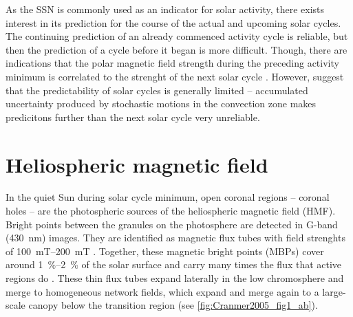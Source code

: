 As the SSN is commonly used as an indicator for solar activity, there exists interest in its prediction for the course of the actual and upcoming solar cycles. The continuing prediction of an already commenced activity cycle is reliable, but then the prediction of a cycle before it began is more difficult. Though, there are indications that the polar magnetic field strength during the preceding activity minimum is correlated to the strenght of the next solar cycle \citep{Schatten1987}. However, \citet{Hathaway2016} suggest that the predictability of solar cycles is generally limited -- accumulated uncertainty produced by stochastic motions in the convection zone makes predicitons further than the next solar cycle very unreliable.


\section{Heliospheric magnetic field}
\label{sec:heliospheric_magnetic_field}
In the quiet Sun during solar cycle minimum, open coronal regions -- coronal holes -- are the photospheric sources of the heliospheric magnetic field (HMF). Bright points between the granules on the photosphere are detected in G-band (\SI{430}{\nano\meter}) images. They are identified as magnetic flux tubes with field strenghts of \SIrange{100}{200}{\milli\tesla} \citep{Cranmer2005}. Together, these magnetic bright points (MBPs) cover around \SIrange{1}{2}{\%} of the solar surface and carry many times the flux that active regions do \citep{Sanchez_Almeida2010}. These thin flux tubes expand laterally in the low chromosphere and merge to homogeneous network fields, which expand and merge again to a large-scale canopy below the transition region (see \autoref{fig:Cranmer2005_fig1_ab}).
